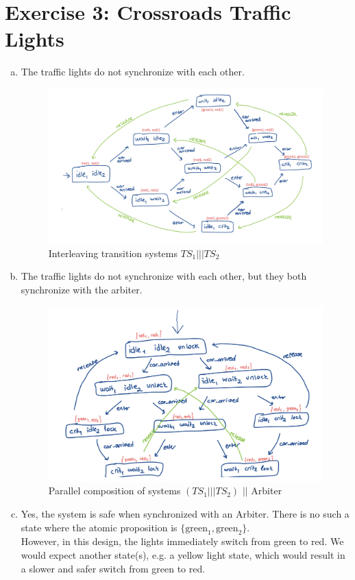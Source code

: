 \documentclass{article}
\begin{document}
\newpage

\section*{Exercise 3: Crossroads Traffic Lights}

\begin{enumerate}[(a)]
    \item{The traffic lights do not synchronize with each other.}
    \begin{figure}[!htb]
        \centering
        \includegraphics[width=5in]{images/3a.png}
        \caption{Interleaving transition systems $TS_1 | | | TS_2$}
        \label{fig:2a}
    \end{figure}

    \item{The traffic lights do not synchronize with each other, but they both synchronize
with the arbiter.}
    \begin{figure}[!htb]
        \centering
        \includegraphics[width=5in]{images/3b.png}
        \caption{Parallel composition of systems $(TS_1 | | | TS_2)$ $| |$ Arbiter}
        \label{fig:2a}
    \end{figure}

    \item{Yes, the system is safe when synchronized with an Arbiter. There is no such a state where the atomic proposition is $\{\text{green}_1, \text{green}_2\}$.}\\
    However, in this design, the lights immediately switch from green to red. We would expect another state(s), e.g. a yellow light state, which would result in a slower and safer switch from green to red. 
\end{enumerate}
\end{document}
